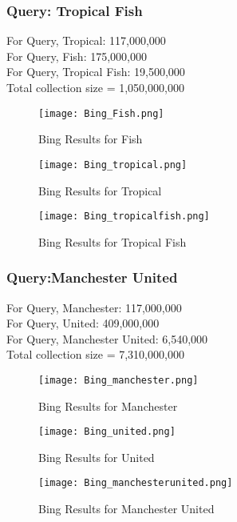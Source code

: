 \documentclass[12pt]{report}
\begin{document}
\subsubsection{Query: Tropical Fish}
For Query, Tropical: 117,000,000\\
For Query, Fish: 175,000,000\\
For Query, Tropical Fish: 19,500,000\\

Total collection size = 1,050,000,000\\

\begin{figure}[ht] 
  \centering
  \texttt{[image: Bing\_Fish.png]}
  \caption{Bing Results for Fish}
  \label{fig:13}
\end{figure}

\begin{figure}[ht] 
  \centering
  \texttt{[image: Bing\_tropical.png]}
  \caption{Bing Results for Tropical}
  \label{fig:14}
\end{figure}

\begin{figure}[ht] 
  \centering
  \texttt{[image: Bing\_tropicalfish.png]}
  \caption{Bing Results for Tropical Fish}
  \label{fig:15}
\end{figure}

\subsubsection{Query:Manchester United}
For Query, Manchester: 117,000,000\\
For Query, United: 409,000,000\\
For Query, Manchester United: 6,540,000\\

Total collection size = 7,310,000,000\\

\begin{figure}[ht] 
  \centering
  \texttt{[image: Bing\_manchester.png]}
  \caption{Bing Results for Manchester}
  \label{fig:16}
\end{figure}

\begin{figure}[ht] 
  \centering
  \texttt{[image: Bing\_united.png]}
  \caption{Bing Results for United}
  \label{fig:17}
\end{figure}

\begin{figure}[ht] 
  \centering
  \texttt{[image: Bing\_manchesterunited.png]}
  \caption{Bing Results for Manchester United}
  \label{fig:18}
\end{figure}
\end{document}
